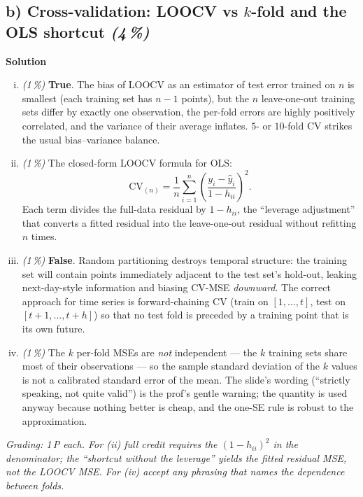 \documentclass[11pt,a4paper]{article}
\newcommand{\subpoints}[1]{\textit{(#1\,\%)}}
\newcommand{\sol}{\noindent\textbf{Solution}}
\begin{document}
\subsection*{b) Cross-validation: LOOCV vs $k$-fold and the OLS shortcut \subpoints{4}}
\sol{}
\begin{enumerate}[(i)]
  \item \subpoints{1} \textbf{True}. The bias of LOOCV as an estimator of test error trained on $n$
        is smallest (each training set has $n-1$ points), but the $n$ leave-one-out training sets
        differ by exactly one observation, the per-fold errors are highly positively correlated,
        and the variance of their average inflates. $5$- or $10$-fold CV strikes the usual
        bias--variance balance.
  \item \subpoints{1} The closed-form LOOCV formula for OLS:
        $$\boxed{\;\mathrm{CV}_{(n)} = \frac{1}{n}\sum_{i=1}^n
           \left(\frac{y_i - \hat y_i}{1 - h_{ii}}\right)^2.\;}$$
        Each term divides the full-data residual by $1-h_{ii}$, the ``leverage adjustment'' that
        converts a fitted residual into the leave-one-out residual without refitting $n$ times.
  \item \subpoints{1} \textbf{False}. Random partitioning destroys temporal structure: the training
        set will contain points immediately adjacent to the test set's hold-out, leaking
        next-day-style information and biasing CV-MSE \emph{downward}. The correct approach for
        time series is forward-chaining CV (train on $[1,\dots,t]$, test on $[t+1,\dots,t+h]$) so
        that no test fold is preceded by a training point that is its own future.
  \item \subpoints{1} The $k$ per-fold MSEs are \emph{not} independent --- the $k$ training sets
        share most of their observations --- so the sample standard deviation of the $k$ values is
        not a calibrated standard error of the mean. The slide's wording (``strictly speaking, not
        quite valid'') is the prof's gentle warning; the quantity is used anyway because nothing
        better is cheap, and the one-SE rule is robust to the approximation.
\end{enumerate}

\noindent\emph{Grading: 1\,P each. For (ii) full credit requires the $(1-h_{ii})^2$ in the
denominator; the ``shortcut without the leverage'' yields the fitted residual MSE, not the LOOCV
MSE. For (iv) accept any phrasing that names the dependence between folds.}
\end{document}
